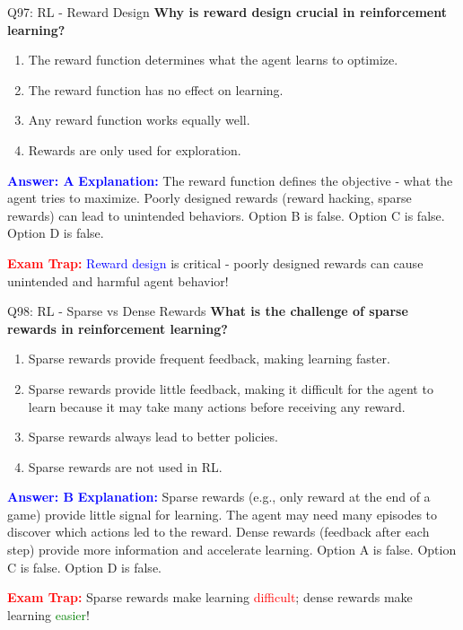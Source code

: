 \documentclass[8pt]{beamer}
\begin{document}
	\begin{frame}{Q97: RL - Reward Design}
		\fontsize{6.5}{7.5}\selectfont
		\textbf{Why is reward design crucial in reinforcement learning?}
		
		\begin{enumerate}
			\item The reward function determines what the agent learns to optimize.
			\item The reward function has no effect on learning.
			\item Any reward function works equally well.
			\item Rewards are only used for exploration.
		\end{enumerate}
		
		\vspace{0.1cm}
		\textcolor{blue}{\textbf{Answer: A}}
		\vspace{0.1cm}
		\textcolor{blue}{\textbf{Explanation:}} The reward function defines the objective - what the agent tries to maximize. Poorly designed rewards (reward hacking, sparse rewards) can lead to unintended behaviors. Option B is false. Option C is false. Option D is false.
		
		\textcolor{red}{\textbf{Exam Trap:}} \textcolor{blue}{Reward design} is critical - poorly designed rewards can cause unintended and harmful agent behavior!
	\end{frame}
	
	\begin{frame}{Q98: RL - Sparse vs Dense Rewards}
		\fontsize{6.5}{7.5}\selectfont
		\textbf{What is the challenge of sparse rewards in reinforcement learning?}
		
		\begin{enumerate}
			\item Sparse rewards provide frequent feedback, making learning faster.
			\item Sparse rewards provide little feedback, making it difficult for the agent to learn because it may take many actions before receiving any reward.
			\item Sparse rewards always lead to better policies.
			\item Sparse rewards are not used in RL.
		\end{enumerate}
		
		\vspace{0.1cm}
		\textcolor{blue}{\textbf{Answer: B}}
		\vspace{0.1cm}
		\textcolor{blue}{\textbf{Explanation:}} Sparse rewards (e.g., only reward at the end of a game) provide little signal for learning. The agent may need many episodes to discover which actions led to the reward. Dense rewards (feedback after each step) provide more information and accelerate learning. Option A is false. Option C is false. Option D is false.
		
		\textcolor{red}{\textbf{Exam Trap:}} Sparse rewards make learning \textcolor{red}{difficult}; dense rewards make learning \textcolor{green}{easier}!
	\end{frame}
	
\end{document}
